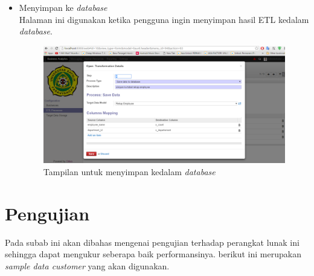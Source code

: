 \begin{itemize}
		\item Menyimpan ke \textit{database}\\
		Halaman ini digunakan ketika pengguna ingin menyimpan hasil ETL kedalam \textit{database}.

		\begin{figure}[H]
		\centering
		\includegraphics[scale=0.4]{Gambar/tampilan-simpan-database}
		\caption{Tampilan untuk menyimpan kedalam \textit{database}}
		\end{figure}
	\end{itemize}
	
	\section{Pengujian}
	Pada subab ini akan dibahas mengenai pengujian terhadap perangkat lunak ini sehingga dapat mengukur seberapa baik performansinya. berikut ini merupakan \textit{sample data customer} yang akan digunakan.
	
